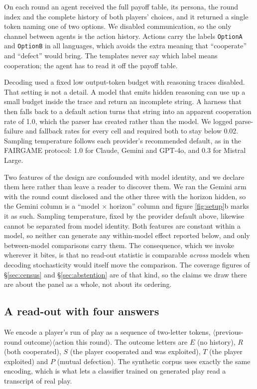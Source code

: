 \documentclass[11pt,a4paper]{article}
\begin{document}
On each round an agent received the full payoff table, its persona, the round
index and the complete history of both players' choices, and it returned a
single token naming one of two options. We disabled communication, so the only
channel between agents is the action history. Actions carry the labels
\texttt{OptionA} and \texttt{OptionB} in all languages, which avoids the
extra meaning that ``cooperate'' and ``defect'' would bring. The templates never
say which label means cooperation; the agent has to read it off the payoff
table.

Decoding used a fixed low output-token budget with reasoning traces disabled.
That setting is not a detail. A model that emits hidden reasoning can use up a
small budget inside the trace and return an incomplete string. A harness that
then falls back to a default action turns that string into an apparent
cooperation rate of 1.0, which the parser has created rather than the model.
We logged parse-failure and fallback rates for every cell and required both to
stay below 0.02. Sampling temperature follows each provider's recommended
default, as in the FAIRGAME protocol: 1.0 for Claude, Gemini and GPT-4o, and
0.3 for Mistral Large.

\label{sec:confounds}
Two features of the design are confounded with model identity, and we declare
them here rather than leave a reader to discover them. We ran the Gemini arm
with the round count disclosed and the other three with the horizon hidden, so
the Gemini column is a ``model $\times$ horizon'' column and figure
\ref{fig:setup}b marks it as such. Sampling temperature, fixed by the provider
default above, likewise cannot be separated from model identity. Both features
are constant within a model, so neither can generate any within-model effect
reported below, and only between-model comparisons carry them. The consequence,
which we invoke wherever it bites, is that no read-out statistic is comparable
\emph{across} models when decoding stochasticity would itself move the
comparison. The coverage figures of \S\ref{sec:census} and
\S\ref{sec:abstention} are of that kind, so the claims we draw there are about
the panel as a whole, not about its ordering.

\subsection{A read-out with four answers}
\label{sec:readout}

We encode a player's run of play as a sequence of two-letter tokens,
$\langle$previous-round outcome$\rangle\langle$action this round$\rangle$. The
outcome letters are $E$ (no history), $R$ (both cooperated), $S$ (the player
cooperated and was exploited), $T$ (the player exploited) and $P$ (mutual
defection). The synthetic corpus uses exactly the same encoding, which is what
lets a classifier trained on generated play read a transcript of real play.
\end{document}
